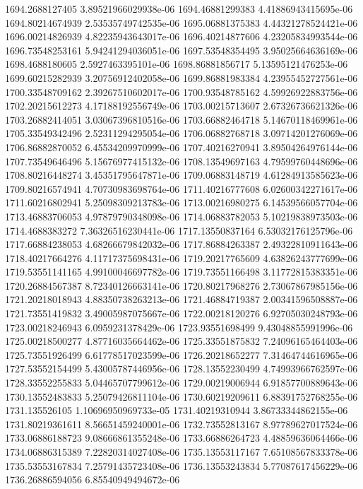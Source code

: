 {1694.2688127405 3.89521966029938e-06
1694.46881299383 4.41886943415695e-06
1694.80214674939 2.53535749742535e-06
1695.06881375383 4.44321278524421e-06
1696.00214826939 4.82235943643017e-06
1696.40214877606 4.23205834993544e-06
1696.73548253161 5.94241294036051e-06
1697.53548354495 3.95025664636169e-06
1698.4688180605 2.5927463395101e-06
1698.86881856717 5.13595121476253e-06
1699.60215282939 3.20756912402058e-06
1699.86881983384 4.23955452727561e-06
1700.33548709162 2.39267510602017e-06
1700.93548785162 4.59926922883756e-06
1702.20215612273 4.17188192556749e-06
1703.00215713607 2.67326736621326e-06
1703.26882414051 3.03067396810516e-06
1703.66882464718 5.14670118469961e-06
1705.33549342496 2.52311294295054e-06
1706.06882768718 3.09714201276069e-06
1706.86882870052 6.45534209970999e-06
1707.40216270941 3.89504264976144e-06
1707.73549646496 5.15676977415132e-06
1708.13549697163 4.79599760448696e-06
1708.80216448274 3.45351795647871e-06
1709.06883148719 4.61284913585623e-06
1709.80216574941 4.70730983698764e-06
1711.40216777608 6.02600342271617e-06
1711.60216802941 5.25098309213783e-06
1713.00216980275 6.14539566057704e-06
1713.46883706053 4.97879790348098e-06
1714.06883782053 5.10219838973503e-06
1714.4688383272 7.36326516230441e-06
1717.13550837164 6.53032176125796e-06
1717.66884238053 4.68266679842032e-06
1717.86884263387 2.49322810911643e-06
1718.40217664276 4.11717375698431e-06
1719.20217765609 4.63826243777699e-06
1719.53551141165 4.99100046697782e-06
1719.73551166498 3.11772815383351e-06
1720.26884567387 8.72340126663141e-06
1720.80217968276 2.73067867985156e-06
1721.20218018943 4.88350738263213e-06
1721.46884719387 2.00341596508887e-06
1721.73551419832 3.49005987075667e-06
1722.00218120276 6.92705030248793e-06
1723.00218246943 6.0959231378429e-06
1723.93551698499 9.43048855991996e-06
1725.00218500277 4.87716035664462e-06
1725.33551875832 7.24096165464403e-06
1725.73551926499 6.61778517023599e-06
1726.20218652277 7.31464744616965e-06
1727.53552154499 5.43005787446956e-06
1728.13552230499 4.74993966762597e-06
1728.33552255833 5.04465707799612e-06
1729.00219006944 6.91857700889643e-06
1730.13552483833 5.25079426811104e-06
1730.60219209611 6.88391752768255e-06
1731.135526105 1.10696950969733e-05
1731.40219310944 3.86733344862155e-06
1731.80219361611 8.56651459240001e-06
1732.73552813167 8.97789627017524e-06
1733.06886188723 9.08666861355248e-06
1733.66886264723 4.48859636064466e-06
1734.06886315389 7.22820314027408e-06
1735.13553117167 7.65108567833378e-06
1735.53553167834 7.25791435723408e-06
1736.13553243834 5.77087617456229e-06
1736.26886594056 6.85540949494672e-06
}
